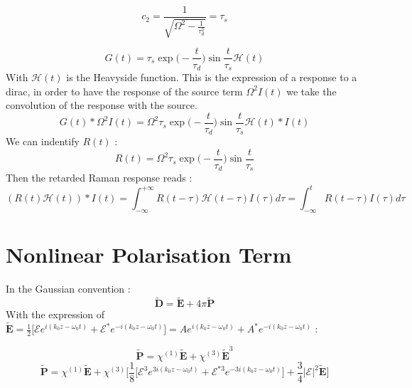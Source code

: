 \documentclass[11pt,a4paper]{article}
\begin{document}
\begin{equation*}
c_2 =\frac{1}{\sqrt{\Omega^2-\frac{1}{\tau_d^2}}} = \tau_s
\end{equation*}

\begin{equation*}
G(t) = \tau_s\exp{\bigg(-\frac{t}{\tau_d}\bigg)}\sin{\frac{t}{\tau_s}}\mathcal{H}(t)
\end{equation*}
With $\mathcal{H}(t)$ is the Heavyside function.
This is the expression of a response to a dirac, in order to have the response of the source term $\Omega^2I(t)$ we take the convolution of the response with the source.
\begin{equation*}
G(t)\ast\Omega^2I(t) = \Omega^2\tau_s\exp{\bigg(-\frac{t}{\tau_d}\bigg)}\sin{\frac{t}{\tau_s}}\mathcal{H}(t)\ast I(t)
\end{equation*}
We can indentify $R(t)$ :
\begin{equation*}
R(t) = \Omega^2\tau_s\exp{\bigg(-\frac{t}{\tau_d}\bigg)}\sin{\frac{t}{\tau_s}}
\end{equation*}
Then the retarded Raman response reads : 
\begin{equation*}
(R(t)\mathcal{H}(t))\ast I(t) = \int_{-\infty}^{+\infty}R(t-\tau)\mathcal{H}(t-\tau)I(\tau)d\tau = \int_{-\infty}^{t}R(t-\tau)I(\tau)d\tau
\end{equation*}

\section{Nonlinear Polarisation Term}

In the Gaussian convention :
\begin{equation*}
\tilde{\mathbf{D}} = \tilde{\mathbf{E}} + 4\pi\tilde{\mathbf{P}}
\end{equation*}
With the expression of $\tilde{\mathbf{E}}=\frac{1}{2}\big[\mathcal{E}e^{i(k_0z-\omega_0t)}+\mathcal{E}^*e^{-i(k_0z-\omega_0t)}\big] = Ae^{i(k_0z-\omega_0t)}+A^*e^{-i(k_0z-\omega_0t)}$ :

\begin{equation*}
\tilde{\mathbf{P}} = \chi^{(1)}\tilde{\mathbf{E}}+ \chi^{(3)}\tilde{\mathbf{E}}^3
\end{equation*}
\begin{equation*}
\tilde{\mathbf{P}} = \chi^{(1)}\tilde{\mathbf{E}}+ \chi^{(3)}\Bigg[\frac{1}{8}\big[\mathcal{E}^3e^{3i(k_0z-\omega_0t)}+\mathcal{E}^{*3}e^{-3i(k_0z-\omega_0t)}\big] +\frac{3}{4}|\mathcal{E}|^2\tilde{\mathbf{E}}\Bigg]
\end{equation*}
\end{document}
